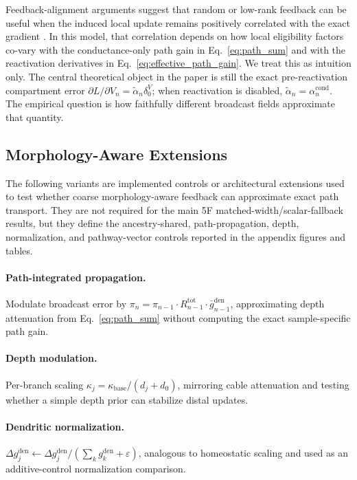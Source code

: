     Feedback-alignment arguments suggest that random or low-rank feedback can be useful when the induced local update remains positively correlated with the exact gradient \cite{lillicrap2016random}. In this model, that correlation depends on how local eligibility factors co-vary with the conductance-only path gain in Eq.~\eqref{eq:path_sum} and with the reactivation derivatives in Eq.~\eqref{eq:effective_path_gain}. We treat this as intuition only. The central theoretical object in the paper is still the exact pre-reactivation compartment error $\partial L/\partial V_n=\tilde{\alpha}_n\delta_0^V$; when reactivation is disabled, $\tilde{\alpha}_n=\alpha_n^{\mathrm{cond}}$. The empirical question is how faithfully different broadcast fields approximate that quantity.
    
    \subsection{Morphology-Aware Extensions}
    The following variants are implemented controls or architectural extensions used to test whether coarse morphology-aware feedback can approximate exact path transport. They are not required for the main 5F matched-width/scalar-fallback results, but they define the ancestry-shared, path-propagation, depth, normalization, and pathway-vector controls reported in the appendix figures and tables.
    
    \paragraph{Path-integrated propagation.}
    Modulate broadcast error by $\pi_n = \pi_{n-1} \cdot R_{n-1}^{\mathrm{tot}} \cdot \bar{g}_{n-1}^{\mathrm{den}}$, approximating depth attenuation from Eq.~\eqref{eq:path_sum} without computing the exact sample-specific path gain.
    
    \paragraph{Depth modulation.}
    Per-branch scaling $\kappa_j = \kappa_{\mathrm{base}} / (d_j + d_0)$, mirroring cable attenuation and testing whether a simple depth prior can stabilize distal updates.
    
    \paragraph{Dendritic normalization.}
    $\Delta g_j^{\mathrm{den}} \leftarrow \Delta g_j^{\mathrm{den}} / (\sum_k g_k^{\mathrm{den}} + \varepsilon)$, analogous to homeostatic scaling \cite{turrigiano2008homeostatic} and used as an additive-control normalization comparison.
    
